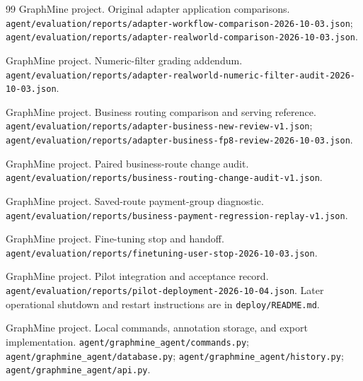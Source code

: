\documentclass[11pt,a4paper]{article}
\newcommand{\pathref}[1]{\nolinkurl{#1}}
\begin{document}
\begin{thebibliography}{99}
GraphMine project. Original adapter application comparisons.
\pathref{agent/evaluation/reports/adapter-workflow-comparison-2026-10-03.json};
\pathref{agent/evaluation/reports/adapter-realworld-comparison-2026-10-03.json}.

GraphMine project. Numeric-filter grading addendum.
\pathref{agent/evaluation/reports/adapter-realworld-numeric-filter-audit-2026-10-03.json}.

GraphMine project. Business routing comparison and serving reference.
\pathref{agent/evaluation/reports/adapter-business-new-review-v1.json};
\pathref{agent/evaluation/reports/adapter-business-fp8-review-2026-10-03.json}.

GraphMine project. Paired business-route change audit.
\pathref{agent/evaluation/reports/business-routing-change-audit-v1.json}.

GraphMine project. Saved-route payment-group diagnostic.
\pathref{agent/evaluation/reports/business-payment-regression-replay-v1.json}.

GraphMine project. Fine-tuning stop and handoff.
\pathref{agent/evaluation/reports/finetuning-user-stop-2026-10-03.json}.

GraphMine project. Pilot integration and acceptance record.
\pathref{agent/evaluation/reports/pilot-deployment-2026-10-04.json}.
Later operational shutdown and restart instructions are in
\pathref{deploy/README.md}.

GraphMine project. Local commands, annotation storage, and export implementation.
\pathref{agent/graphmine_agent/commands.py};
\pathref{agent/graphmine_agent/database.py};
\pathref{agent/graphmine_agent/history.py};
\pathref{agent/graphmine_agent/api.py}.
\end{thebibliography}
\end{document}
